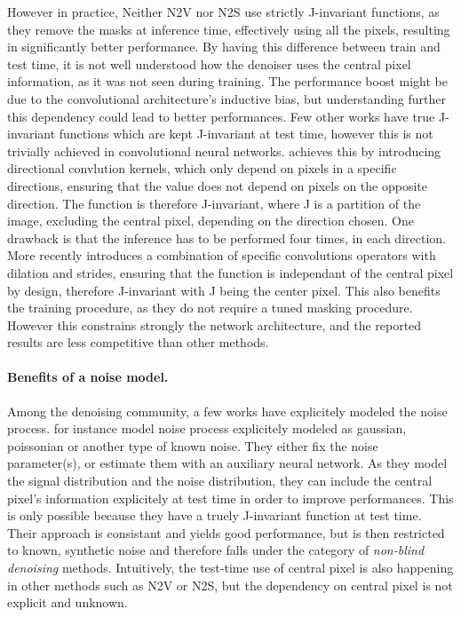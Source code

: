\documentclass{article}
\begin{document}
However in practice, Neither N2V nor N2S use strictly J-invariant functions, as they remove the masks at inference time,
effectively using all the pixels, resulting in significantly better performance. By having this difference between train and test time, it is not well understood how the denoiser uses the central pixel information, as it was not seen during training. The performance boost might be due to the convolutional architecture's inductive bias, but understanding further this dependency could lead to better performances.
Few other works have true J-invariant functions which are kept J-invariant at test time, however this is not trivially achieved in convolutional neural networks. \cite{laine2019high} achieves this by introducing directional convlution kernels, which only depend on pixels in a specific directions, ensuring that the value does not depend on pixels on the opposite direction. The function is therefore J-invariant, where J is a partition of the image, excluding the central pixel, depending on the direction chosen. One drawback is that the inference has to be performed four times, in each direction.
More recently \cite{lee2020noise2kernel} introduces a combination of specific convolutions operators with dilation and strides, ensuring that the function is independant of the central pixel by design, therefore J-invariant with J being the center pixel. This also benefits the training procedure, as they do not require a tuned masking procedure. However this constrains strongly the network architecture, and the reported results are less competitive than other methods.

\paragraph{Benefits of a noise model.}
Among the denoising community, a few works have explicitely modeled the noise process. \cite{laine2019high} for instance model noise process explicitely modeled as gaussian, poissonian or another type of known noise. They either fix the noise parameter(s), or estimate them with an auxiliary neural network. As they model the signal distribution and the noise distribution, they can include the central pixel's information explicitely at test time in order to improve performances. This is only possible because they have a truely J-invariant function at test time. Their approach is consistant and yields good performance, but is then restricted to known, synthetic noise and therefore falls under the category of \textit{non-blind denoising} methods.
Intuitively, the test-time use of central pixel is also happening in other methods such as N2V or N2S, but the dependency on central pixel is not explicit and unknown.
\end{document}
